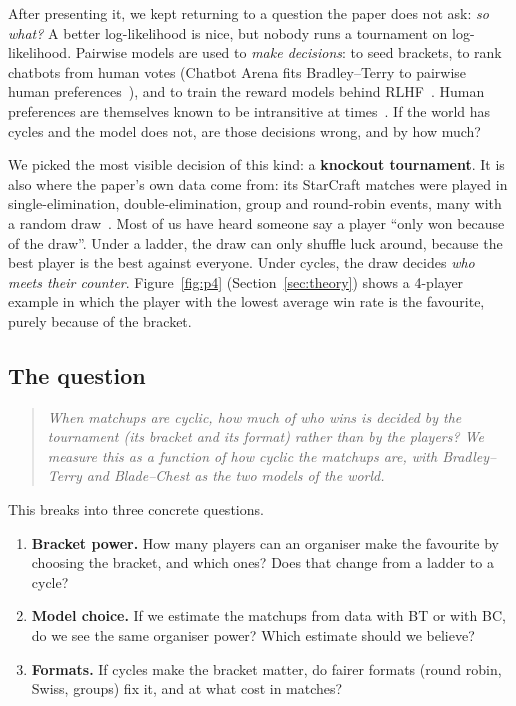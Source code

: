 \documentclass[11pt]{article}
\theoremstyle{remark}
\begin{document}
After presenting it, we kept returning to a question the paper does not ask: \emph{so what?} A better log-likelihood is
nice, but nobody runs a tournament on log-likelihood. Pairwise models are used to \emph{make decisions}: to seed brackets, to
rank chatbots from human votes (Chatbot Arena fits Bradley--Terry to pairwise human preferences~\cite{chiang2024arena}), and
to train the reward models behind RLHF~\cite{ouyang2022training}. Human preferences are themselves known to be intransitive
at times~\cite{tversky1969intransitivity}. If the world has cycles and the model does not, are those decisions wrong, and
by how much?

We picked the most visible decision of this kind: a \textbf{knockout tournament}. It is also where the paper's own data come
from: its StarCraft matches were played in single-elimination, double-elimination, group and round-robin events, many with a
random draw~\cite[\S4.3.1]{chen2016blade}. Most of us have heard someone say a player ``only won because of the draw''. Under a
ladder, the draw can only shuffle luck around, because the best player is the best against everyone. Under cycles, the
draw decides \emph{who meets their counter}. Figure~\ref{fig:p4} (Section~\ref{sec:theory}) shows a 4-player example in which
the player with the lowest average win rate is the favourite, purely because of the bracket.

\subsection{The question}
\begin{quote}
\emph{When matchups are cyclic, how much of who wins is decided by the tournament (its bracket and its format) rather than by
the players? We measure this as a function of how cyclic the matchups are, with Bradley--Terry and Blade--Chest as the two
models of the world.}
\end{quote}
This breaks into three concrete questions.
\begin{enumerate}
\item[\textbf{Q1}] \textbf{Bracket power.} How many players can an organiser make the favourite by choosing the bracket, and
which ones? Does that change from a ladder to a cycle?
\item[\textbf{Q2}] \textbf{Model choice.} If we estimate the matchups from data with BT or with BC, do we see the same organiser
power? Which estimate should we believe?
\item[\textbf{Q3}] \textbf{Formats.} If cycles make the bracket matter, do fairer formats (round robin, Swiss, groups) fix it, and
at what cost in matches?
\end{enumerate}
\end{document}
